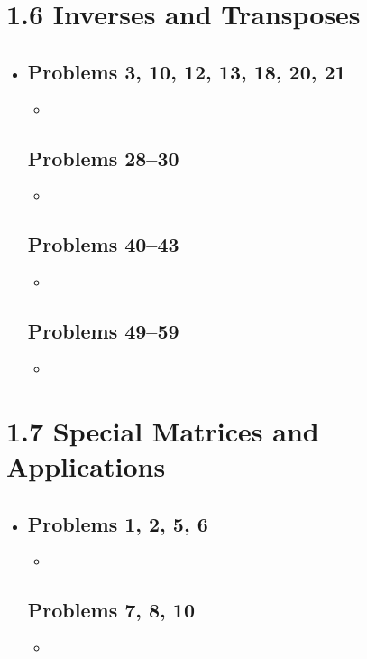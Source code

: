 \section{1.6 Inverses and Transposes}
\begin{itemize}
  \item []

    \subsection{Problems 3, 10, 12, 13, 18, 20, 21}
    \begin{itemize}
      \item
    \end{itemize}

    \subsection{Problems 28--30}
    \begin{itemize}
      \item
    \end{itemize}

    \subsection{Problems 40--43}
    \begin{itemize}
      \item
    \end{itemize}

    \subsection{Problems 49--59}
    \begin{itemize}
      \item
    \end{itemize}

\end{itemize}

\section{1.7 Special Matrices and Applications}
\begin{itemize}
  \item []

    \subsection{Problems 1, 2, 5, 6}
    \begin{itemize}
      \item
    \end{itemize}

    \subsection{Problems 7, 8, 10}
    \begin{itemize}
      \item
    \end{itemize}

\end{itemize}
